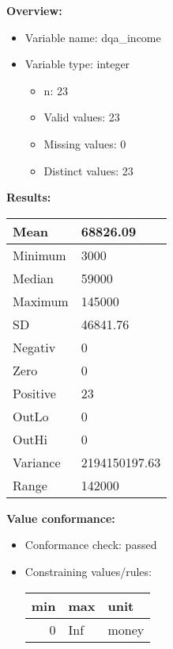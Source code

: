 \documentclass[
]{article}
\providecommand{\tightlist}{%
  \setlength{\itemsep}{0pt}\setlength{\parskip}{0pt}}
\begin{document}
\textbf{Overview:}

\begin{itemize}
\tightlist
\item
  Variable name: dqa\_income
\item
  Variable type: integer

  \begin{itemize}
  \tightlist
  \item
    n: 23
  \item
    Valid values: 23
  \item
    Missing values: 0
  \item
    Distinct values: 23
  \end{itemize}
\end{itemize}

\textbf{Results:}\\

\begin{table}[H]
\centering
\begin{tabular}{l|l}
\hline
Mean & 68826.09\\
\hline
Minimum & 3000\\
\hline
Median & 59000\\
\hline
Maximum & 145000\\
\hline
SD & 46841.76\\
\hline
Negativ & 0\\
\hline
Zero & 0\\
\hline
Positive & 23\\
\hline
OutLo & 0\\
\hline
OutHi & 0\\
\hline
Variance & 2194150197.63\\
\hline
Range & 142000\\
\hline
\end{tabular}
\end{table}

\textbf{Value conformance:}

\begin{itemize}
\tightlist
\item
  Conformance check: passed
\item
  Constraining values/rules:

  \begin{table}[H]
  \centering
  \begin{tabular}{r|l|l}
  \hline
  \textbf{min} & \textbf{max} & \textbf{unit}\\
  \hline
  0 & Inf & money\\
  \hline
  \end{tabular}
  \end{table}
\end{itemize}
\end{document}
